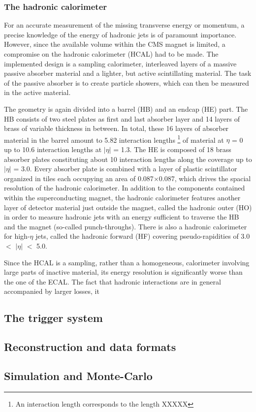\subsubsection*{The hadronic calorimeter}
For an accurate measurement of the missing transverse energy or momentum, a precise knowledge of the energy of hadronic jets is of 
paramount importance. However, since the available volume within the CMS magnet is limited, a compromise on the hadronic calorimeter (HCAL)
had to be made. The implemented design is a sampling calorimeter, interleaved layers of a massive passive absorber material and a lighter,
but active scintillating material. The task of the passive absorber is to create particle showers, which can then be measured in the active
material. 

The geometry is again divided into a barrel (HB) and an endcap (HE) part. The HB consists of two steel plates as first and last absorber layer and
14 layers of brass of variable thickness in between. In total, these 16 layers of absorber material in the barrel amount to 5.82 interaction lengths
\footnote{An interaction length corresponds to the length XXXXX} of material at $\eta$ = 0 up to 10.6 interaction lengths at $|\eta|$ = 1.3. The HE
is composed of 18 brass absorber plates constituting about 10 interaction lengths along the coverage up to $|\eta|$ = 3.0.
Every absorber plate is combined with a layer of plastic scintillator organized in tiles each occupying an area of 0.087$\times$0.087, which drives 
the spacial resolution of the hadronic calorimeter. In addition to the components contained within the superconducting magnet, the hadronic calorimeter
features another layer of detector material just outside the magnet, called the hadronic outer (HO) in order to measure hadronic jets with an energy
sufficient to traverse the HB and the magnet (so-called punch-throughs). There is also a hadronic calorimeter for high-$\eta$ jets, called the hadronic forward (HF) covering 
pseudo-rapidities of 3.0 $<$ $|\eta|$ $<$ 5.0.

Since the HCAL is a sampling, rather than a homogeneous, calorimeter involving large parts of inactive material, its energy resolution is significantly
worse than the one of the ECAL. The fact that hadronic interactions are in general accompanied by larger losses, it 


\subsection{The trigger system}
\label{sub:cms_trigger}
\subsection{Reconstruction and data formats}
\label{sub:cms_reco}
\subsection{Simulation and Monte-Carlo}
\label{sub:cms_mc}
